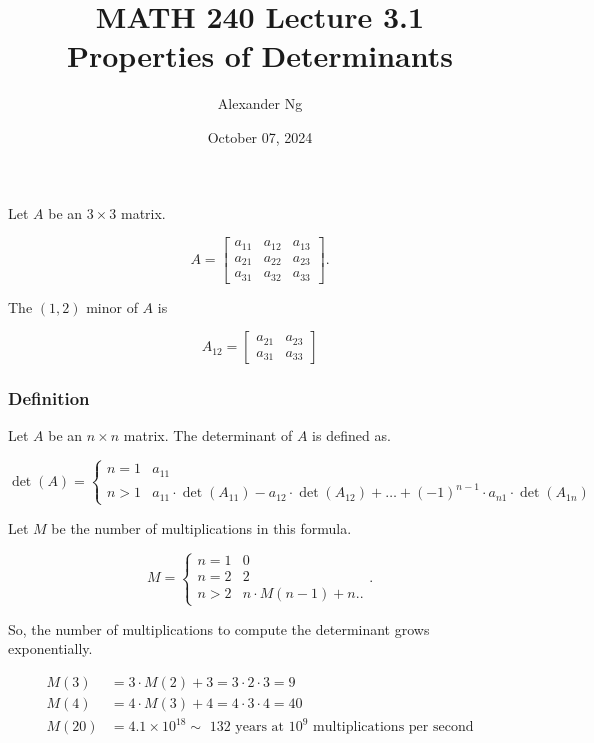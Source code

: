 \documentclass[12pt]{article}
\begin{document}
\renewcommand{\arraystretch}{1.25} %
\setlength{\arraycolsep}{12pt} 

\title{MATH 240 Lecture 3.1\\Properties of Determinants}
\author{Alexander Ng}
\date{October 07, 2024}

\maketitle

Let $A$ be an $3 \times 3$ matrix.

\[
  A = \begin{bmatrix}
    a_{11} & a_{12} & a_{13} \\
    a_{21} & a_{22} & a_{23} \\
    a_{31} & a_{32} & a_{33}
    \end{bmatrix}
.\]

The $(1, 2)$ minor of $A$ is

\[
  A_{12} = \begin{bmatrix}
    a_{21} & a_{23} \\
    a_{31} & a_{33}
  \end{bmatrix}
\]

\subsubsection*{Definition}

Let $A$ be an $n \times n$ matrix. The determinant of $A$ is defined as.

$\det(A) = \begin{cases}
  n=1 & a_{11}\\
  n > 1& a_{11} \cdot \det(A_{11}) - a_{12} \cdot \det(A_{12}) + \dots 
  + (-1)^{n-1} \cdot a_{n1} \cdot \det(A_{1n})
\end{cases}$

Let $M$ be the number of multiplications in this formula.

\[
  M = \begin{cases}
    n=1 & 0 \\
    n=2 & 2 \\
    n>2 & n \cdot M(n-1) + n.
  .\end{cases}
.\]

So, the number of multiplications to compute the determinant grows exponentially.

\begin{align}
  M(3) &= 3 \cdot M(2) + 3 = 3 \cdot 2 \cdot 3 = 9\\
  M(4) &= 4 \cdot M(3) + 4 = 4 \cdot 3 \cdot 4 = 40\\
  M(20) &= 4.1 \times 10^{18} \sim \text{ 132 years at } 10^{9} \text{ multiplications per second}
\end{align}
\end{document}
